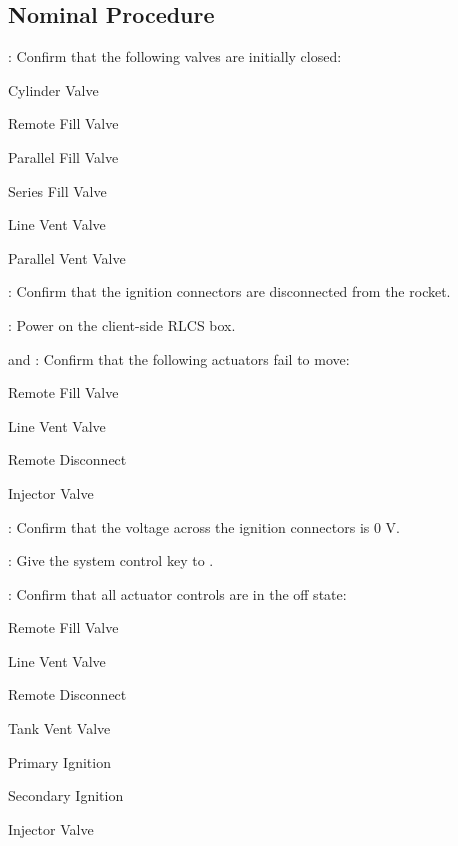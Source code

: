 \subsection{Nominal Procedure}
\begin{checklist}
    \item \primary{}: Confirm that the following valves are initially closed:
        \begin{checklist}
        \item Cylinder Valve
        \item Remote Fill Valve
        \item Parallel Fill Valve
        \item Series Fill Valve
        \item Line Vent Valve
        \item Parallel Vent Valve
    \end{checklist}
    \item \primary{}: Confirm that the ignition connectors are disconnected from the rocket.
    \item \control{}: Power on the client-side RLCS box.
    \item \control{} and \secondary: Confirm that the following actuators fail to move:
    \begin{checklist}
        \item Remote Fill Valve
        \item Line Vent Valve
        \item Remote Disconnect
        \item Injector Valve
    \end{checklist}
    \item \secondary: Confirm that the voltage across the ignition connectors is 0 V.
    \item \ops: Give the system control key to \control{}.
    \item \control: Confirm that all actuator controls are in the off state:
    \begin{checklist}
        \item Remote Fill Valve
        \item Line Vent Valve
        \item Remote Disconnect
        \item Tank Vent Valve
        \item Primary Ignition
        \item Secondary Ignition
        \item Injector Valve

\end{checklist}
\end{checklist}
